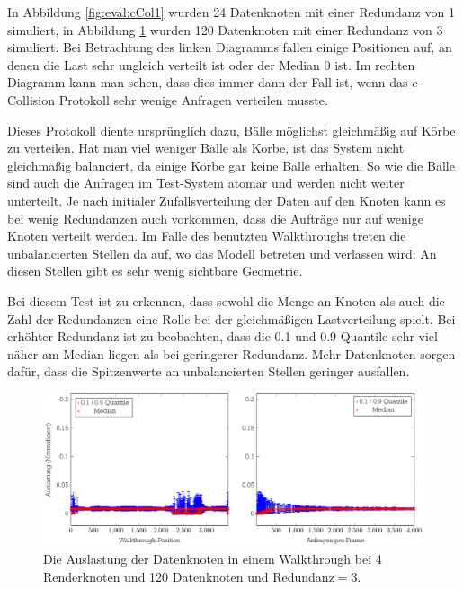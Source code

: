 In Abbildung \ref{fig:eval:cCol1} wurden 24 Datenknoten mit einer Redundanz von 1 simuliert, in Abbildung \ref{fig:eval:cCol9} wurden 120 Datenknoten mit einer Redundanz von 3 simuliert. Bei Betrachtung des linken Diagramms fallen einige Positionen auf, an denen die Last sehr ungleich verteilt ist oder der Median 0 ist. Im rechten Diagramm kann man sehen, dass dies immer dann der Fall ist, wenn das $c$-Collision Protokoll sehr wenige Anfragen verteilen musste. 

Dieses Protokoll diente ursprünglich dazu, Bälle möglichst gleichmäßig auf Körbe zu verteilen. Hat man viel weniger Bälle als Körbe, ist das System nicht gleichmäßig balanciert, da einige Körbe gar keine Bälle erhalten. So wie die Bälle sind auch die Anfragen im Test-System atomar und werden nicht weiter unterteilt. Je nach initialer Zufallsverteilung der Daten auf den Knoten kann es bei wenig Redundanzen auch vorkommen, dass die Aufträge nur auf wenige Knoten verteilt werden. Im Falle des benutzten Walkthroughs treten die unbalancierten Stellen da auf, wo das Modell betreten und verlassen wird: An diesen Stellen gibt es sehr wenig sichtbare Geometrie.
\medskip

Bei diesem Test ist zu erkennen, dass sowohl die Menge an Knoten als auch die Zahl der Redundanzen eine Rolle bei der gleichmäßigen Lastverteilung spielt. Bei erhöhter Redundanz ist zu beobachten, dass die 0.1 und 0.9 Quantile sehr viel näher am Median liegen als bei geringerer Redundanz. Mehr Datenknoten sorgen dafür, dass die Spitzenwerte an unbalancierten Stellen geringer ausfallen.
\begin{figure}
 \centering
\includegraphics[width=\hsize]{images/diag_cCol_red3_render4_data120_2x.pdf}
  \caption{\label{fig:eval:cCol9}Die Auslastung der Datenknoten in einem Walkthrough bei 4 Renderknoten und 120 Datenknoten und Redundanz$=$3.}
\end{figure}


